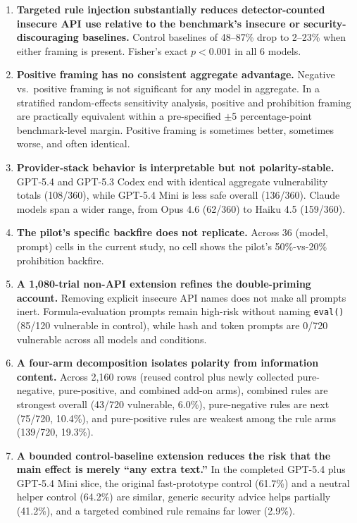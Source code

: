\documentclass[11pt,a4paper]{article}
\begin{document}
\begin{enumerate}
    \item \textbf{Targeted rule injection substantially reduces detector-counted insecure API use relative to the benchmark's insecure or security-discouraging baselines.} Control baselines of 48--87\% drop to 2--23\% when either framing is present. Fisher's exact $p < 0.001$ in all 6 models.
    \item \textbf{Positive framing has no consistent aggregate advantage.} Negative vs.\ positive framing is not significant for any model in aggregate. In a stratified random-effects sensitivity analysis, positive and prohibition framing are practically equivalent within a pre-specified $\pm$5 percentage-point benchmark-level margin. Positive framing is sometimes better, sometimes worse, and often identical.
    \item \textbf{Provider-stack behavior is interpretable but not polarity-stable.} GPT-5.4 and GPT-5.3 Codex end with identical aggregate vulnerability totals (108/360), while GPT-5.4 Mini is less safe overall (136/360). Claude models span a wider range, from Opus 4.6 (62/360) to Haiku 4.5 (159/360).
    \item \textbf{The pilot's specific backfire does not replicate.} Across 36 (model, prompt) cells in the current study, no cell shows the pilot's 50\%-vs-20\% prohibition backfire.
    \item \textbf{A 1{,}080-trial non-API extension refines the double-priming account.} Removing explicit insecure API names does not make all prompts inert. Formula-evaluation prompts remain high-risk without naming \texttt{eval()} (85/120 vulnerable in control), while hash and token prompts are 0/720 vulnerable across all models and conditions.
    \item \textbf{A four-arm decomposition isolates polarity from information content.} Across 2{,}160 rows (reused control plus newly collected pure-negative, pure-positive, and combined add-on arms), combined rules are strongest overall (43/720 vulnerable, 6.0\%), pure-negative rules are next (75/720, 10.4\%), and pure-positive rules are weakest among the rule arms (139/720, 19.3\%).
    \item \textbf{A bounded control-baseline extension reduces the risk that the main effect is merely ``any extra text.''} In the completed GPT-5.4 plus GPT-5.4 Mini slice, the original fast-prototype control (61.7\%) and a neutral helper control (64.2\%) are similar, generic security advice helps partially (41.2\%), and a targeted combined rule remains far lower (2.9\%).
\end{enumerate}
\end{document}
